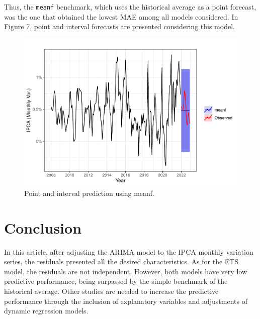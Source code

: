 \documentclass{statsoc}
\begin{document}
Thus, the \texttt{meanf} benchmark, which uses the historical average as
a point forecast, was the one that obtained the lowest MAE among all
models considered. In Figure 7, point and interval forecasts are
presented considering this model.

\begin{figure}

{\centering \includegraphics[height=0.4\textheight]{Trabalho_2_article_files/figure-latex/preds-plot-1} 

}

\caption{Point and interval prediction using meanf.}\label{fig:preds-plot}
\end{figure}

\hypertarget{conclusion}{%
\section{Conclusion}\label{conclusion}}

In this article, after adjusting the ARIMA model to the IPCA monthly
variation series, the residuals presented all the desired
characteristics. As for the ETS model, the residuals are not
independent. However, both models have very low predictive performance,
being surpassed by the simple benchmark of the historical average. Other
studies are needed to increase the predictive performance through the
inclusion of explanatory variables and adjustments of dynamic regression
models.



\end{document}

